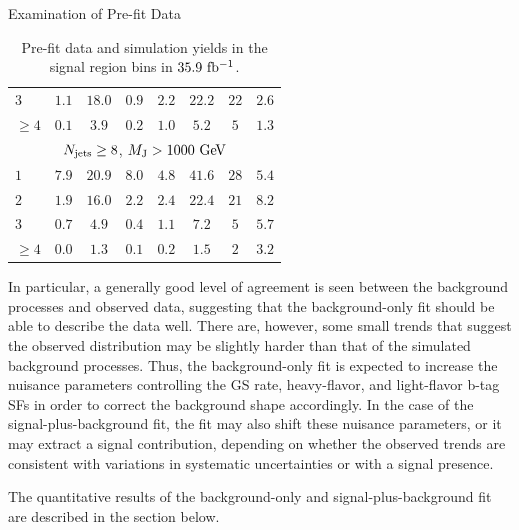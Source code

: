 \begin{section}{Examination of Pre-fit Data}
\begin{table}
\begin{tabular}[tbp!]{ l | c  c  c  c | c |  c | c  }
$3$       &  $1.1$    &  $18.0$   &  $0.9$    &  $2.2$   &  $22.2$    &  $22$   &  $2.6$ \\
$\geq 4$  &  $0.1$    &  $3.9$    &  $0.2$    &  $1.0$   &  $5.2$     &  $5$    &  $1.3$ \\
\hline
\multicolumn{8}{c}{$N_{\mathrm{jets}} \geq 8$, $M_{\mathrm{J}} > 1000~\mathrm{Ge\kern -0.1em V}$} \\
\hline
$1$       &  $7.9$    &  $20.9$   &  $8.0$    &  $4.8$   &  $41.6$    &  $28$   &  $5.4$ \\
$2$       &  $1.9$    &  $16.0$   &  $2.2$    &  $2.4$   &  $22.4$    &  $21$   &  $8.2$ \\
$3$       &  $0.7$    &  $4.9$    &  $0.4$    &  $1.1$   &  $7.2$     &  $5$    &  $5.7$ \\
$\geq 4$  &  $0.0$    &  $1.3$    &  $0.1$    &  $0.2$   &  $1.5$     &  $2$    &  $3.2$ \\
\hline
\hline
\end{tabular}
\caption{Pre-fit data and simulation yields in the signal region bins in $35.9~\mathrm{fb^{-1}}$.}
\label{tab:prefit_sr}
\end{table}

In particular, a generally good level of agreement is seen between the background processes and observed data, suggesting that the background-only fit should be able to describe the data well.
There are, however, some small trends that suggest the observed \Nb distribution may be slightly harder than that of the simulated background processes.
Thus, the background-only fit is expected to increase the nuisance parameters controlling the GS rate, heavy-flavor, and light-flavor b-tag SFs in order to correct the background shape accordingly.
In the case of the signal-plus-background fit, the fit may also shift these nuisance parameters, or it may extract a signal contribution, depending on whether the observed trends are consistent with variations in systematic uncertainties or with a signal presence.

The quantitative results of the background-only and signal-plus-background fit are described in the section below.

\end{section}

